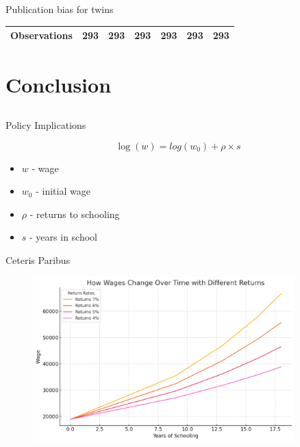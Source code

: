 \documentclass{beamer} %
\begin{document}
\begin{frame}{Publication bias for twins}
\begin{tiny}
\begin{table}[!htbp]
\begin{tabular}{
                    @{}
                    l*{6}{c}}
                \midrule
                \addlinespace[0.5em]
                Observations                          & 293     & 293     & 293     & 293     & 293     & 293     \\

                \bottomrule
            \end{tabular}
        \end{table}

    \end{tiny}
\end{frame}


\section{Conclusion}
\subsection{}

\begin{frame}{Policy Implications}

    \centering
    \large

    \begin{equation*}
        \log(w) = log(w_0) + \rho \times s
    \end{equation*}

    \bigskip

    \normalsize
    \begin{itemize}
        \item $w$ - wage
        \item $w_0$ - initial wage
        \item $\rho$ - returns to schooling
        \item $s$ - years in school
    \end{itemize}
\end{frame}

\begin{frame}{Ceteris Paribus}
    \begin{figure}[htbp]
        \begin{center}
            \includegraphics[width=0.9\textwidth]{Figures/mincer_example.png}
        \end{center}
    \end{figure}
\end{frame}
\end{document}

